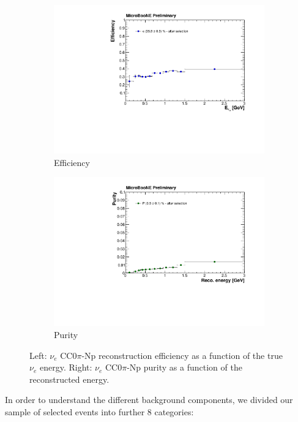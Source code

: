 \documentclass[a4paper]{article}
\begin{document}
\begin{figure}
  \begin{subfigure}{0.48\textwidth}
    \includegraphics[width=\linewidth]{figures/eff.pdf}
    \caption{Efficiency} 
  \end{subfigure}
    \begin{subfigure}{0.48\textwidth}
    \includegraphics[width=\linewidth]{figures/purity.pdf}
    \caption{Purity} 
  \end{subfigure}
  \caption{Left: $\nu_{e}$ CC$0\pi$-Np reconstruction efficiency as a function of the true $\nu_{e}$ energy. Right: $\nu_{e}$ CC$0\pi$-Np purity as a function of the reconstructed energy.}
  \label{fig:effpurity}
\end{figure}

In order to understand the different background components, we divided our sample of selected events into further 8 categories:
\end{document}
